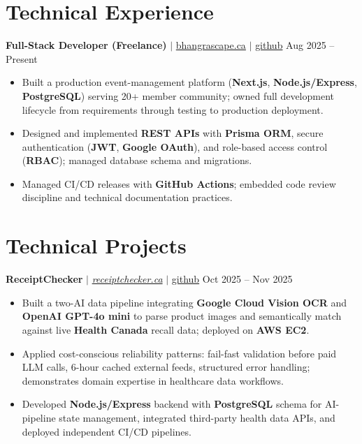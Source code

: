 \documentclass[11pt,a4paper]{article}
\begin{document}
\section{Technical Experience}

\textbf{Full-Stack Developer (Freelance)} $|$ \href{https://bhangrascape.ca}{bhangrascape.ca} $|$ \href{https://github.com/bhat0155/bhangraescape}{\small github} \hfill Aug 2025 -- Present
\begin{itemize}
    \item Built a production event-management platform (\textbf{Next.js}, \textbf{Node.js/Express}, \textbf{PostgreSQL}) serving 20+ member community; owned full development lifecycle from requirements through testing to production deployment.
    \item Designed and implemented \textbf{REST APIs} with \textbf{Prisma ORM}, secure authentication (\textbf{JWT}, \textbf{Google OAuth}), and role-based access control (\textbf{RBAC}); managed database schema and migrations.
    \item Managed CI/CD releases with \textbf{GitHub Actions}; embedded code review discipline and technical documentation practices.
\end{itemize}

\section{Technical Projects}

\textbf{ReceiptChecker} $|$ \href{https://receiptchecker.ca/}{\emph{receiptchecker.ca}} $|$ \href{https://github.com/bhat0155/receipt-check}{\small github} \hfill Oct 2025 -- Nov 2025
\begin{itemize}
    \item Built a two-AI data pipeline integrating \textbf{Google Cloud Vision OCR} and \textbf{OpenAI GPT-4o mini} to parse product images and semantically match against live \textbf{Health Canada} recall data; deployed on \textbf{AWS EC2}.
    \item Applied cost-conscious reliability patterns: fail-fast validation before paid LLM calls, 6-hour cached external feeds, structured error handling; demonstrates domain expertise in healthcare data workflows.
    \item Developed \textbf{Node.js/Express} backend with \textbf{PostgreSQL} schema for AI-pipeline state management, integrated third-party health data APIs, and deployed independent CI/CD pipelines.
\end{itemize}
\end{document}
